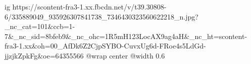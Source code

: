  
 
 
 
 

\ifcmt
  ig https://scontent-fra3-1.xx.fbcdn.net/v/t39.30808-6/335889049_935926307841738_7346430323560622218_n.jpg?_nc_cat=101&ccb=1-7&_nc_sid=8bfeb9&_nc_ohc=1R5mH123LocAX9ag4aH&_nc_ht=scontent-fra3-1.xx&oh=00_AfDk6Z2CjpSYBO-CuvxUg6d-FRoe4s5LdGd-jjzjkZpkFg&oe=64355566
  @wrap center
  @width 0.6
\fi
